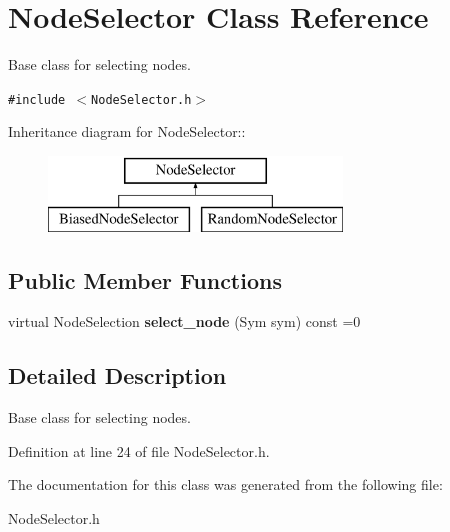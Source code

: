 \section{Node\-Selector Class Reference}
\label{class_node_selector}
Base class for selecting nodes.  


{\tt \#include $<$Node\-Selector.h$>$}

Inheritance diagram for Node\-Selector::\begin{figure}[H]
\begin{center}
\leavevmode
\includegraphics[height=2cm]{class_node_selector}
\end{center}
\end{figure}
\subsection*{Public Member Functions}
\begin{CompactItemize}
\item 
virtual Node\-Selection {\bf select\_\-node} (Sym sym) const =0\label{class_node_selector_a1}

\end{CompactItemize}


\subsection{Detailed Description}
Base class for selecting nodes. 



Definition at line 24 of file Node\-Selector.h.

The documentation for this class was generated from the following file:\begin{CompactItemize}
\item 
Node\-Selector.h\end{CompactItemize}
